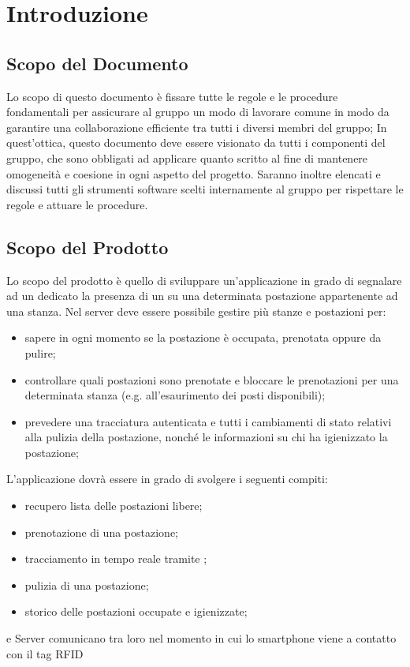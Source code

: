 \section{Introduzione}

\subsection{Scopo del Documento}
Lo scopo di questo  documento è fissare  tutte  le  regole  e  le  procedure fondamentali per assicurare al gruppo un modo di lavorare comune in modo da   
garantire una collaborazione efficiente tra tutti i diversi membri  del  gruppo; In quest’ottica, questo documento deve essere visionato da tutti i componenti del gruppo, che 
sono obbligati ad applicare quanto scritto al fine di mantenere omogeneità e coesione in ogni aspetto del progetto. Saranno inoltre elencati e discussi tutti gli   
strumenti software scelti internamente al gruppo per rispettare le regole e attuare le procedure.

\subsection{Scopo del Prodotto}
Lo scopo del prodotto è quello di sviluppare un’applicazione in grado di
segnalare ad un  dedicato la presenza di un  su una determinata postazione appartenente ad
una stanza. 
Nel server deve essere possibile gestire più stanze e postazioni per:
\begin{itemize}
\item{sapere in ogni momento se la postazione è occupata, prenotata oppure da pulire;}
\item{controllare quali postazioni sono prenotate e bloccare le prenotazioni per una determinata
stanza (e.g. all'esaurimento dei posti disponibili);}
\item{prevedere una tracciatura autenticata e tutti i cambiamenti di stato relativi alla pulizia della
postazione, nonché le informazioni su chi ha igienizzato la postazione;}
\end{itemize}
L'applicazione dovrà essere in grado di svolgere i seguenti compiti:
\begin{itemize}
\item{recupero lista delle postazioni libere;}
\item{prenotazione di una postazione;}
\item{tracciamento in tempo reale tramite  ;}
\item{pulizia di una postazione;}
\item{storico delle postazioni occupate e igienizzate;}
\end{itemize}
 e Server comunicano tra loro nel momento in cui lo smartphone viene  a contatto con il tag RFID

